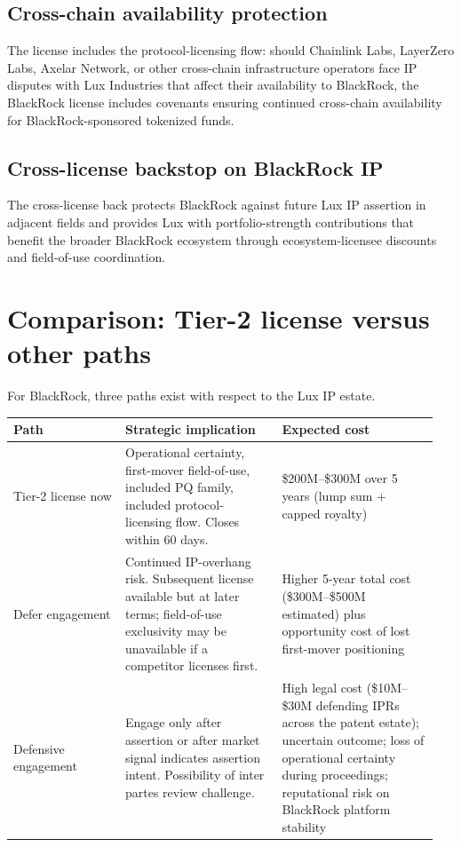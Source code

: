 \documentclass[11pt,letterpaper]{article}
\begin{document}
\subsection{Cross-chain availability protection}

The license includes the protocol-licensing flow: should Chainlink Labs, LayerZero Labs, Axelar Network, or other cross-chain infrastructure operators face IP disputes with Lux Industries that affect their availability to BlackRock, the BlackRock license includes covenants ensuring continued cross-chain availability for BlackRock-sponsored tokenized funds.

\subsection{Cross-license backstop on BlackRock IP}

The cross-license back protects BlackRock against future Lux IP assertion in adjacent fields and provides Lux with portfolio-strength contributions that benefit the broader BlackRock ecosystem through ecosystem-licensee discounts and field-of-use coordination.

\section{Comparison: Tier-2 license versus other paths}

For BlackRock, three paths exist with respect to the Lux IP estate.

\begin{longtable}{p{0.25\linewidth}p{0.35\linewidth}p{0.35\linewidth}}
\toprule
\textbf{Path} & \textbf{Strategic implication} & \textbf{Expected cost} \\
\midrule
Tier-2 license now & Operational certainty, first-mover field-of-use, included PQ family, included protocol-licensing flow. Closes within 60 days. & \$200M--\$300M over 5 years (lump sum + capped royalty) \\
\midrule
Defer engagement & Continued IP-overhang risk. Subsequent license available but at later terms; field-of-use exclusivity may be unavailable if a competitor licenses first. & Higher 5-year total cost (\$300M--\$500M estimated) plus opportunity cost of lost first-mover positioning \\
\midrule
Defensive engagement & Engage only after assertion or after market signal indicates assertion intent. Possibility of inter partes review challenge. & High legal cost (\$10M--\$30M defending IPRs across the patent estate); uncertain outcome; loss of operational certainty during proceedings; reputational risk on BlackRock platform stability \\
\bottomrule
\end{longtable}
\end{document}
